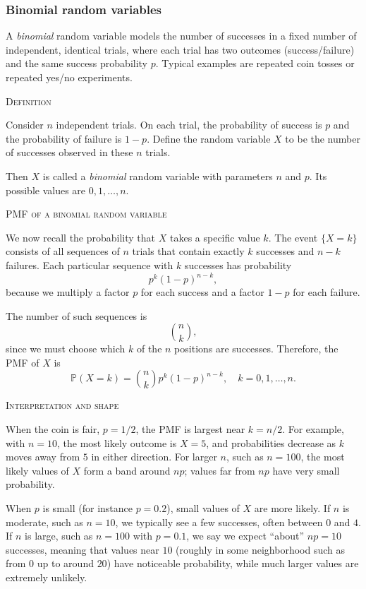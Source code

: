 \subsubsection{Binomial random variables}

A \textit{binomial} random variable models the number of successes in a fixed number of independent, identical trials, where each trial has two outcomes (success/failure) and the same success probability \(p\).  
Typical examples are repeated coin tosses or repeated yes/no experiments.

\bigskip\textsc{Definition}

Consider \(n\) independent trials.  
On each trial, the probability of success is \(p\) and the probability of failure is \(1-p\).  
Define the random variable \(X\) to be the number of successes observed in these \(n\) trials.  

Then \(X\) is called a \textit{binomial} random variable with parameters \(n\) and \(p\).  
Its possible values are \(0,1,\dots,n\).

\bigskip\textsc{PMF of a binomial random variable}

We now recall the probability that \(X\) takes a specific value \(k\).  
The event \(\{X = k\}\) consists of all sequences of \(n\) trials that contain exactly \(k\) successes and \(n-k\) failures.  
Each particular sequence with \(k\) successes has probability
\[
p^k (1-p)^{n-k},
\]
because we multiply a factor \(p\) for each success and a factor \(1-p\) for each failure.  

The number of such sequences is
\[
\binom{n}{k},
\]
since we must choose which \(k\) of the \(n\) positions are successes.  
Therefore, the PMF of \(X\) is
\[
\mathbb{P}(X = k) = \binom{n}{k} p^k (1-p)^{n-k}, \quad k = 0,1,\dots,n.
\]

\bigskip\textsc{Interpretation and shape}

When the coin is fair, \(p = 1/2\), the PMF is largest near \(k = n/2\).  
For example, with \(n = 10\), the most likely outcome is \(X = 5\), and probabilities decrease as \(k\) moves away from \(5\) in either direction.  
For larger \(n\), such as \(n = 100\), the most likely values of \(X\) form a band around \(np\); values far from \(np\) have very small probability.

When \(p\) is small (for instance \(p = 0.2\)), small values of \(X\) are more likely.  
If \(n\) is moderate, such as \(n = 10\), we typically see a few successes, often between \(0\) and \(4\).  
If \(n\) is large, such as \(n = 100\) with \(p = 0.1\), we say we expect “about” \(np = 10\) successes, meaning that values near \(10\) (roughly in some neighborhood such as from \(0\) up to around \(20\)) have noticeable probability, while much larger values are extremely unlikely.


